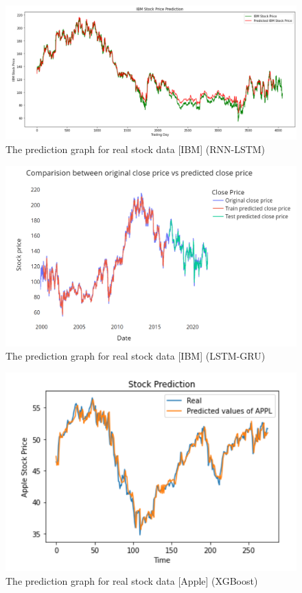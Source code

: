 \documentclass[conference]{IEEEtran}
\begin{document}
\begin{figure}[htbp]
	\centerline{\includegraphics[scale=0.3]{rnn-lstm.png}}
	\caption{The prediction graph for real stock data [IBM] (RNN-LSTM)}
	\label{rnn-lstm}
\end{figure}

\begin{figure}[htbp]
	\centerline{\includegraphics[scale=0.4]{lstm-gru.png}}
	\caption{The prediction graph for real stock data [IBM] (LSTM-GRU)}
	\label{lstm-gru}
\end{figure}

\begin{figure}[htbp]
	\centerline{\includegraphics[scale=0.5]{xgboost.png}}
	\caption{The prediction graph for real stock data [Apple] (XGBoost)}
	\label{xgboost}
\end{figure}
\end{document}
